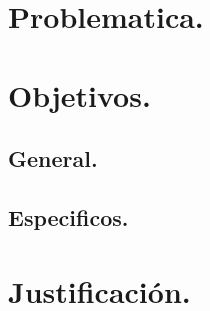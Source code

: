 \section{Problematica.}
\section{Objetivos.}
\subsection{General.}
\subsection{Especificos.}
\section{Justificación.}